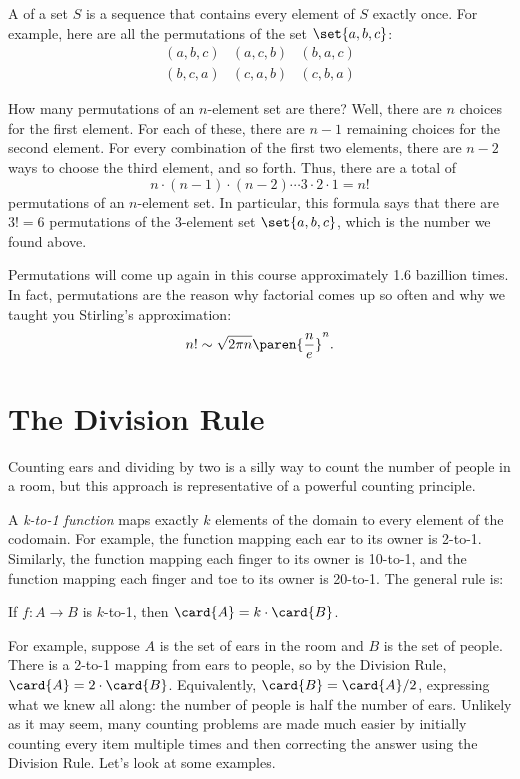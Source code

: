A  of a set $S$ is a sequence that contains every
element of $S$ exactly once.  For example, here are all the
permutations of the set $\set{a, b, c}$:
%
\[
\begin{array}{ccc}
(a, b, c) & (a, c, b) & (b, a, c) \\
(b, c, a) & (c, a, b) & (c, b, a)
\end{array}
\]

How many permutations of an $n$-element set are there?  Well, there
are $n$ choices for the first element.  For each of these, there are
$n - 1$ remaining choices for the second element.  For every
combination of the first two elements, there are $n - 2$ ways to
choose the third element, and so forth.  Thus, there are a total of
%
\[
n \cdot (n-1) \cdot (n-2) \cdots 3 \cdot 2 \cdot 1 = n!
\]
%
permutations of an $n$-element set.  In particular, this formula says
that there are $3! = 6$ permutations of the 3-element set $\set{a, b,
c}$, which is the number we found above.

Permutations will come up again in this course approximately 1.6
bazillion times.  In fact, permutations are the reason why factorial
comes up so often and why we taught you Stirling's approximation:
%
\[
n! \sim \sqrt{2 \pi n} \paren{\frac{n}{e}}^n.
\]

\section{The Division Rule}\label{division_rule_sec}

Counting ears and dividing by two is a silly way to count the number of
people in a room, but this approach is representative of a powerful
counting principle.

A \emph{k-to-1 function}%
maps exactly $k$ elements of the domain to
every element of the codomain.  For example, the function mapping each
ear to its owner is 2-to-1. Similarly, the function mapping each
finger to its owner is 10-to-1, and the function mapping each finger
and toe to its owner is 20-to-1.  The general rule is:
\begin{rul}
If $f : A \to B$ is $k$-to-1, then $\card{A} = k \cdot \card{B}$.
\end{rul}

For example, suppose $A$ is the set of ears in the room and $B$ is the set
of people.  There is a 2-to-1 mapping from ears to people, so by the
Division Rule, $\card{A} = 2 \cdot \card{B}$.  Equivalently, $\card{B} =
\card{A} / 2$, expressing what we knew all along: the number of people is
half the number of ears.  Unlikely as it may seem, many counting problems
are made much easier by initially counting every item multiple times and
then correcting the answer using the Division Rule.  Let's look at some
examples.

